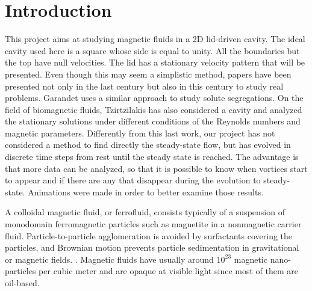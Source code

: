 \documentclass[journal]{IEEEtran}
\begin{document}
%
\IEEEpeerreviewmaketitle

\section{Introduction}
This project aims at studying magnetic fluids in a 2D lid-driven cavity. The ideal cavity used here is a square whose side is equal to unity. All the boundaries but the top have null velocities. The lid has a stationary velocity pattern that will be presented. Even though this may seem a simplistic method, papers have been presented not only in the last century but also in this century to study real problems. Garandet \cite{Garandet2012149} uses a similar approach to study solute segregations. On the field of biomagnetic fluids, Tzirtzilakis \cite{Tzirtzilakis2013} has also considered a cavity and analyzed the stationary solutions under different conditions of the Reynolds numbers and magnetic parameters. Differently from this last work, our project has not considered a method to find directly the steady-state flow, but has evolved in discrete time steps from rest until the steady state is reached. The advantage is that more data can be analyzed, so that it is possible to know when vortices start to appear and if there are any that disappear during the evolution to steady-state. Animations were made in order to better examine those results.

A colloidal magnetic fluid, or ferrofluid, consists typically of a suspension of monodomain ferromagnetic particles such as magnetite in a nonmagnetic carrier fluid. Particle-to-particle agglomeration is avoided by surfactants covering the particles, and Brownian motion prevents particle sedimentation in gravitational or magnetic fields.  \cite{RosensweigMagneticFluids}. Magnetic fluids have usually around $10^{23}$ magnetic nano-particles per cubic meter and are opaque at visible light since most of them are oil-based.
\end{document}
